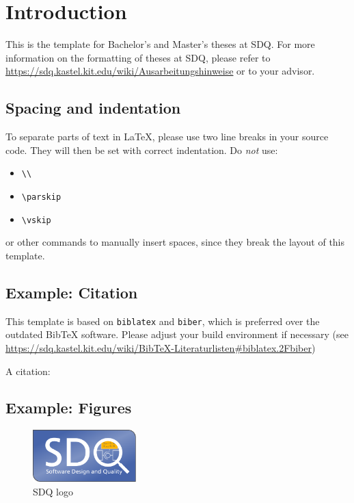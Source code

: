 
\chapter{Introduction}
\label{ch:Introduction}


This is the template for Bachelor's and Master's theses at SDQ.
For more information on the formatting of theses at SDQ, please refer to
\url{https://sdq.kastel.kit.edu/wiki/Ausarbeitungshinweise} or to your advisor.

\section{Spacing and indentation}
To separate parts of text in \LaTeX, please use two line breaks in your source code.
They will then be set with correct indentation.
Do \emph{not} use:
\begin{itemize}
  \itemsep0em
  \item \texttt{\textbackslash\textbackslash}
  \item \texttt{\textbackslash parskip}
  \item \texttt{\textbackslash vskip}
\end{itemize} 
or other commands to manually insert spaces, since they break the layout of this template.

\section{Example: Citation}
\label{sec:Introduction:Citation}
This template is based on \texttt{biblatex} and \texttt{biber}, which is preferred over the
outdated Bib\TeX{} software.
Please adjust your build environment if necessary (see
\url{https://sdq.kastel.kit.edu/wiki/BibTeX-Literaturlisten#biblatex.2Fbiber})

A citation: \cite{becker2008a} 

\section{Example: Figures}
\label{sec:Introduction:Figures}
\begin{figure}
\centering
\includegraphics[width=4cm]{logos/sdqlogo}
\caption{SDQ logo}
\label{fig:sdqlogo}
\end{figure}

